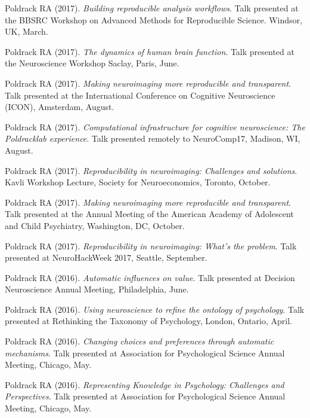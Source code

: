 Poldrack RA (2017). \emph{Building reproducible analysis workflows}. Talk presented at the BBSRC Workshop on Advanced Methods for Reproducible Science. Windsor, UK, March. \vspace{2mm} 

Poldrack RA (2017). \emph{The dynamics of human brain function}. Talk presented at the Neuroscience Workshop Saclay, Paris, June. \vspace{2mm} 

Poldrack RA (2017). \emph{Making neuroimaging more reproducible and transparent}. Talk presented at the International Conference on Cognitive Neuroscience (ICON), Amsterdam, August. \vspace{2mm} 

Poldrack RA (2017). \emph{Computational infrastructure for cognitive neuroscience: The Poldracklab experience}. Talk presented remotely to NeuroComp17, Madison, WI, August. \vspace{2mm} 

Poldrack RA (2017). \emph{Reproducibility in neuroimaging: Challenges and solutions}. Kavli Workshop Lecture, Society for Neuroeconomics, Toronto, October. \vspace{2mm} 

Poldrack RA (2017). \emph{Making neuroimaging more reproducible and transparent}. Talk presented at the Annual Meeting of the American Academy of Adolescent and Child Psychiatry, Washington, DC, October. \vspace{2mm} 

Poldrack RA (2017). \emph{Reproducibility in neuroimaging: What's the problem}. Talk presented at NeuroHackWeek 2017, Seattle, September. \vspace{2mm} 

Poldrack RA (2016). \emph{Automatic influences on value}. Talk presented at Decision Neuroscience Annual Meeting, Philadelphia, June. \vspace{2mm} 

Poldrack RA (2016). \emph{Using neuroscience to refine the ontology of psychology}. Talk presented at Rethinking the Taxonomy of Psychology, London, Ontario, April. \vspace{2mm} 

Poldrack RA (2016). \emph{Changing choices and preferences through automatic mechanisms}. Talk presented at Association for Psychological Science Annual Meeting, Chicago, May. \vspace{2mm} 

Poldrack RA (2016). \emph{Representing Knowledge in Psychology: Challenges and Perspectives}. Talk presented at Association for Psychological Science Annual Meeting, Chicago, May. \vspace{2mm} 

